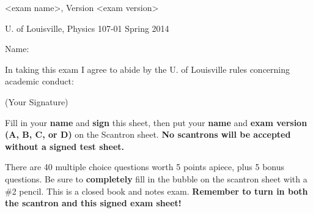 \thispagestyle{empty}

\begin{multicols}{2}[]

	\begin{flushleft}
		<exam name>, Version <exam version>
		
		U. of Louisville, Physics 107-01 Spring 2014

		Name:\\
		\noindent\makebox[\linewidth]{\rule{\linewidth}{0.25pt}}

	\end{flushleft}
	
\end{multicols}

\noindent
In taking this exam I agree to abide by the U. of Louisville rules
concerning academic conduct:

\bigskip\bigskip

\begin{flushright}
	\noindent\makebox[\linewidth]{\rule{\textwidth}{0.25pt}}
	(Your Signature)
\end{flushright}

\bigskip

\noindent
Fill in your \textbf{name} and \textbf{sign} this sheet, then put your
\textbf{name} and \textbf{exam version (A, B, C, or D)} on the Scantron
sheet. \textbf{No scantrons will be accepted without a signed test sheet.}

\bigskip

\noindent
There are 40 multiple choice questions worth 5 points apiece, plus 5 bonus
questions. Be sure to \textbf{completely} fill in the bubble on the scantron
sheet with a \#2 pencil. This is a closed book and notes exam.
\textbf{Remember to turn in both the scantron and this signed exam sheet!}

\bigskip
